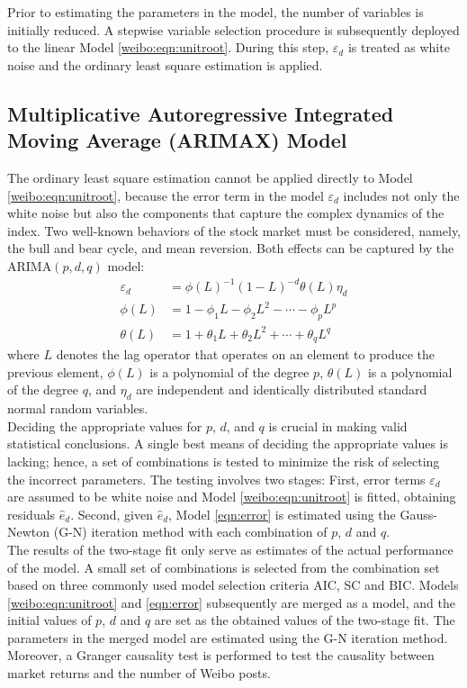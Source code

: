 \documentclass[review,3p,times,12pt,number]{elsarticle}
\begin{document}
Prior to estimating the parameters in the model, the number of variables is initially reduced. A stepwise variable selection procedure is subsequently deployed to the linear Model \ref{weibo:eqn:unitroot}. During this step, $\varepsilon_d$ is treated as white noise and the ordinary least square estimation is applied.

\subsection{Multiplicative Autoregressive Integrated Moving Average (ARIMAX) Model}
The ordinary least square estimation cannot be applied directly to Model \ref{weibo:eqn:unitroot}, because the error term in the model $\varepsilon_d$ includes not only the white noise but also the components that capture the complex dynamics of the index. Two well-known behaviors of the stock market must be considered, namely, the bull and bear cycle, and mean reversion. Both effects can be captured by the ARIMA$(p, d, q)$ model:
\begin{eqnarray}
	\nonumber \varepsilon_d &= \phi(L)^{-1}(1-L)^{-d}\theta(L)\eta_d  \\
	\phi(L)       &= 1-\phi_1 L - \phi_2 L^2 - \cdots - \phi_p L^p \\\label{eqn:error}
	\nonumber \theta(L)     &= 1+\theta_1 L + \theta_2 L^2 + \cdots + \theta_q L^q
\end{eqnarray}
where $L$ denotes the lag operator that operates on an element to produce the previous element, $\phi(L)$ is a polynomial of the degree $p$, $\theta(L)$ is a polynomial of the degree $q$, and $\eta_d$ are independent and identically distributed standard normal random variables.\\
\indent
Deciding the appropriate values for $p$, $d$, and $q$ is crucial in making valid statistical conclusions. A single best means of deciding the appropriate values is lacking; hence, a set of combinations is tested to minimize the risk of selecting the incorrect parameters. The testing involves two stages: First, error terms $\varepsilon_d$ are assumed to be white noise and Model \ref{weibo:eqn:unitroot} is fitted, obtaining residuals $\hat e_d$. Second, given $\hat e_d$, Model \ref{eqn:error} is estimated using the Gauss-Newton (G-N) iteration method with each combination of $p$, $d$ and $q$.\\
\indent
The results of the two-stage fit only serve as estimates of the actual performance of the model. A small set of combinations is selected from the combination set based on three commonly used model selection criteria AIC, SC and BIC. Models \ref{weibo:eqn:unitroot} and \ref{eqn:error} subsequently are merged as a model, and the initial values of $p$, $d$ and $q$ are set as the obtained values of the two-stage fit. The parameters in the merged model are estimated using the G-N iteration method.\\
\indent
Moreover, a Granger causality test is performed to test the causality between market returns and the number of Weibo posts.
\end{document}
